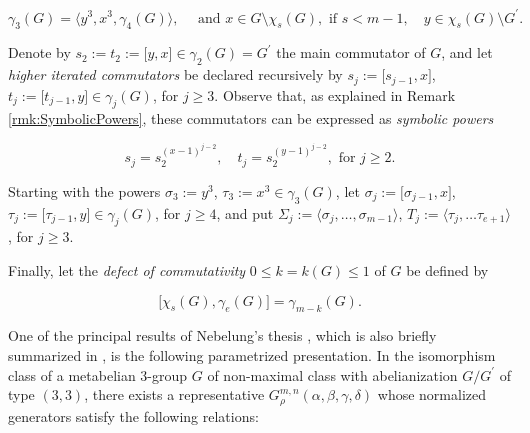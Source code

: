 \documentclass{amsart}
\theoremstyle{definition}
\numberwithin{equation}{section}
\begin{document}
\begin{equation}
\label{eqn:GeneratorsLow}
\gamma_3(G)=\langle y^3,x^3,\gamma_4(G)\rangle, \quad \text{ and } x\in G\setminus\chi_s(G), \text{ if } s<m-1, \quad y\in\chi_s(G)\setminus G^\prime.
\end{equation}

\noindent
Denote by
\(s_2:=t_2:=\lbrack y,x\rbrack\in\gamma_2(G)=G^\prime\)
the main commutator of \(G\),
and let \textit{higher iterated commutators} be declared recursively by
\(s_j:=\lbrack s_{j-1},x\rbrack\), \(t_j:=\lbrack t_{j-1},y\rbrack\in\gamma_j(G)\),
for \(j\ge 3\).
Observe that, as explained in Remark
\ref{rmk:SymbolicPowers},
these commutators can be expressed as \textit{symbolic powers}

\begin{equation}
\label{eqn:SymbolicPowersLow3}
s_j=s_2^{(x-1)^{j-2}}, \quad t_j=s_2^{(y-1)^{j-2}}, \text{ for } j\ge 2.
\end{equation}

\noindent
Starting with the powers \(\sigma_3:=y^3\), \(\tau_3:=x^3\in\gamma_3(G)\), let
\(\sigma_j:=\lbrack\sigma_{j-1},x\rbrack\), \(\tau_j:=\lbrack\tau_{j-1},y\rbrack\in\gamma_j(G)\),
for \(j\ge 4\),
and put \(\Sigma_j:=\langle\sigma_j,\ldots,\sigma_{m-1}\rangle\),
\(T_j:=\langle\tau_j,\ldots\tau_{e+1}\rangle\), for \(j\ge 3\).

Finally, let the \textit{defect of commutativity} \(0\le k=k(G)\le 1\) of \(G\) be defined by

\begin{equation}
\label{eqn:DefectLow}
\lbrack\chi_s(G),\gamma_e(G)\rbrack=\gamma_{m-k}(G).
\end{equation}


One of the principal results of Nebelung's thesis
\cite[p. 94]{Ne1},
which is also briefly summarized in
\cite[p. 456]{Ma3},
is the following parametrized presentation.
In the isomorphism class of a metabelian \(3\)-group \(G\) of non-maximal class
with abelianization \(G/G^\prime\) of type \((3,3)\),
there exists a representative \(G_\rho^{m,n}(\alpha,\beta,\gamma,\delta)\)
whose normalized generators satisfy the following relations:
\end{document}
